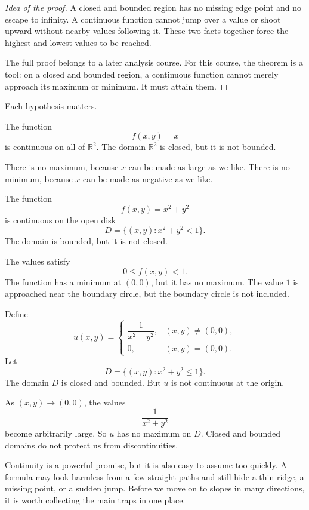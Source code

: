 \begin{proof}[Idea of the proof]
A closed and bounded region has no missing edge point and no escape to infinity.
A continuous function cannot jump over a value or shoot upward without nearby values
following it.  These two facts together force the highest and lowest values to be
reached.

The full proof belongs to a later analysis course.  For this course, the theorem is a
tool: on a closed and bounded region, a continuous function cannot merely approach
its maximum or minimum.  It must attain them.
\end{proof}

Each hypothesis matters.

\begin{example}
The function
\[
    f(x,y)=x
\]
is continuous on all of \(\mathbb R^2\).  The domain \(\mathbb R^2\) is closed, but it is
not bounded.

There is no maximum, because \(x\) can be made as large as we like.  There is no
minimum, because \(x\) can be made as negative as we like.
\end{example}

\begin{example}
The function
\[
    f(x,y)=x^2+y^2
\]
is continuous on the open disk
\[
    D=\{(x,y):x^2+y^2<1\}.
\]
The domain is bounded, but it is not closed.

The values satisfy
\[
    0\le f(x,y)<1.
\]
The function has a minimum at \((0,0)\), but it has no maximum.  The value \(1\)
is approached near the boundary circle, but the boundary circle is not included.
\end{example}

\begin{example}
Define
\[
    u(x,y)=
    \begin{cases}
    \dfrac{1}{x^2+y^2}, & (x,y)\ne(0,0),\\[2mm]
    0, & (x,y)=(0,0).
    \end{cases}
\]
Let
\[
    D=\{(x,y):x^2+y^2\le1\}.
\]
The domain \(D\) is closed and bounded.  But \(u\) is not continuous at the origin.

As \((x,y)\to(0,0)\), the values
\[
    \frac{1}{x^2+y^2}
\]
become arbitrarily large.  So \(u\) has no maximum on \(D\).  Closed and bounded
domains do not protect us from discontinuities.
\end{example}

Continuity is a powerful promise, but it is also easy to assume too quickly.  A formula
may look harmless from a few straight paths and still hide a thin ridge, a missing point,
or a sudden jump.  Before we move on to slopes in many directions, it is worth collecting
the main traps in one place.

